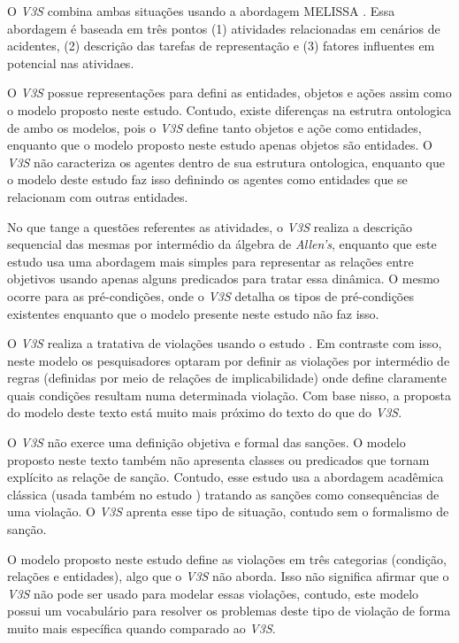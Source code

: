 \documentclass[12pt]{article}
\begin{document}
O \textit{V3S} combina ambas situações usando a abordagem MELISSA \cite{Camus2012}\cite{violationcamille}. Essa abordagem é baseada em três pontos (1) atividades relacionadas em cenários de acidentes, (2) descrição das tarefas de representação e (3) fatores influentes em potencial nas atividaes. 

O \textit{V3S} possue representações para defini as entidades, objetos e ações assim como o modelo proposto neste estudo. Contudo, existe diferenças na estrutra ontologica de ambo os modelos, pois o \textit{V3S} define tanto objetos e açõe como entidades, enquanto que o modelo proposto neste estudo apenas objetos são entidades. O \textit{V3S} não caracteriza os agentes dentro de sua estrutura ontologica, enquanto que o modelo deste estudo faz isso definindo os agentes como entidades que se relacionam com outras entidades. 

No que tange a questões referentes as atividades, o \textit{V3S} realiza a descrição sequencial das mesmas por intermédio da álgebra de \textit{Allen's}, enquanto que este estudo usa uma abordagem mais simples para representar as relações entre objetivos usando apenas alguns predicados para tratar essa dinâmica. O mesmo ocorre para as pré-condições, onde o \textit{V3S} detalha os tipos de pré-condições existentes enquanto que o modelo presente neste estudo não faz isso.

O \textit{V3S} realiza a tratativa de violações usando o estudo \cite{FADIER2003759}. Em contraste com isso, neste modelo os pesquisadores optaram por definir as violações por intermédio de regras (definidas por meio de relações de implicabilidade) onde define claramente quais condições resultam numa determinada violação. Com base nisso, a proposta do modelo deste texto está muito mais próximo do texto \cite{dastaniNormativeMultiAgentProgram} do que do \textit{V3S}. 

O \textit{V3S} não exerce uma definição objetiva e formal das sanções. O modelo proposto neste texto também não apresenta classes ou predicados que tornam explícito as relaçõe de sanção. Contudo, esse estudo usa a abordagem acadêmica clássica (usada também no estudo \cite{dastaniNormativeMultiAgentProgram}) tratando as sanções como consequências de uma violação. O \textit{V3S} aprenta esse tipo de situação, contudo sem o formalismo de sanção. 

O modelo proposto neste estudo define as violações em três categorias (condição, relações e entidades), algo que o \textit{V3S} não aborda. Isso não significa afirmar que o \textit{V3S} não pode ser usado para modelar essas violações, contudo, este modelo possui um vocabulário para resolver os problemas deste tipo de violação de forma muito mais específica quando comparado ao \textit{V3S}. 
\end{document}
